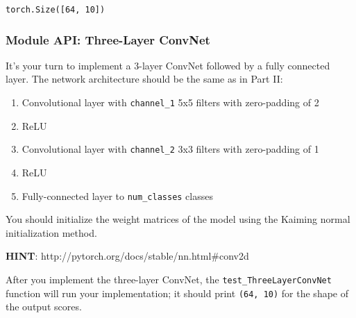 \documentclass[11pt]{article}
\providecommand{\tightlist}{%
      \setlength{\itemsep}{0pt}\setlength{\parskip}{0pt}}
\begin{document}
    \begin{Verbatim}[commandchars=\\\{\}]
torch.Size([64, 10])

    \end{Verbatim}

    \subsubsection{Module API: Three-Layer
ConvNet}\label{module-api-three-layer-convnet}

It's your turn to implement a 3-layer ConvNet followed by a fully
connected layer. The network architecture should be the same as in Part
II:

\begin{enumerate}
\def\labelenumi{\arabic{enumi}.}
\tightlist
\item
  Convolutional layer with \texttt{channel\_1} 5x5 filters with
  zero-padding of 2
\item
  ReLU
\item
  Convolutional layer with \texttt{channel\_2} 3x3 filters with
  zero-padding of 1
\item
  ReLU
\item
  Fully-connected layer to \texttt{num\_classes} classes
\end{enumerate}

You should initialize the weight matrices of the model using the Kaiming
normal initialization method.

\textbf{HINT}: http://pytorch.org/docs/stable/nn.html\#conv2d

After you implement the three-layer ConvNet, the
\texttt{test\_ThreeLayerConvNet} function will run your implementation;
it should print \texttt{(64,\ 10)} for the shape of the output scores.
\end{document}
